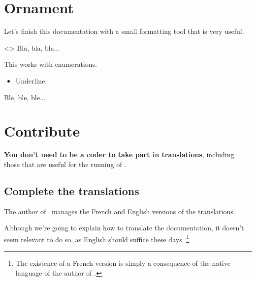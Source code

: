 

\section{Ornament}

Let's finish this documentation with a small formatting tool that is very useful.


\begin{tdoclatex}<>
Bla, bla, bla...

\tdocsep %

This works with enumerations.

\begin{itemize}
    \item Underline.
\end{itemize}

\tdocsep %

Ble, ble, ble...
\end{tdoclatex}


\section{Contribute}

\begin{tdocnote}
    \textbf{You don't need to be a coder to take part in translations}, including those that are useful for the running of \thisproj.
\end{tdocnote}



\subsection{Complete the translations}

\begin{tdocnote}
    The author of \thisproj\ manages the French and English versions of the translations.
\end{tdocnote}


\begin{tdoccaut}
    Although we're going to explain how to translate the documentation, it doesn't seem relevant to do so, as English should suffice these days.%
    \footnote{
      The existence of a French version is simply a consequence of the native language of the author of \thisproj.
    }
\end{tdoccaut}


